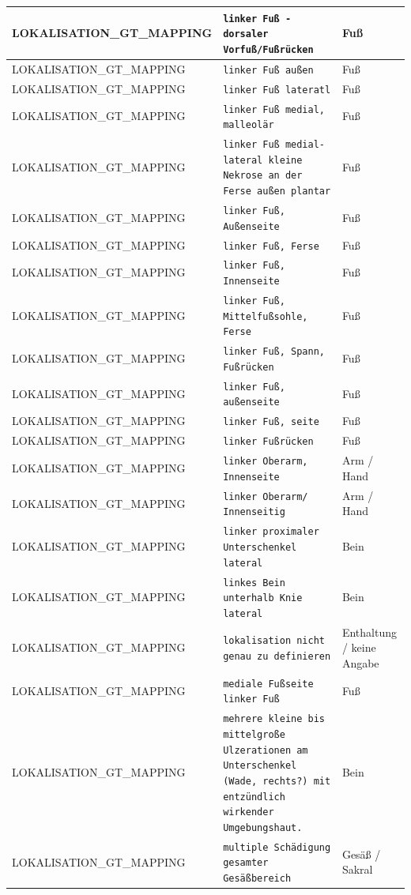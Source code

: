 \begin{longtable}{|p{3.5cm}|p{5cm}|p{6.5cm}|}
LOKALISATION\_GT\_MAPPING & \texttt{linker Fuß - dorsaler Vorfuß/Fußrücken} & Fuß \\ \hline
LOKALISATION\_GT\_MAPPING & \texttt{linker Fuß außen} & Fuß \\ \hline
LOKALISATION\_GT\_MAPPING & \texttt{linker Fuß lateratl} & Fuß \\ \hline
LOKALISATION\_GT\_MAPPING & \texttt{linker Fuß medial, malleolär} & Fuß \\ \hline
LOKALISATION\_GT\_MAPPING & \texttt{linker Fuß medial-lateral 
kleine Nekrose an der Ferse außen plantar} & Fuß \\ \hline
LOKALISATION\_GT\_MAPPING & \texttt{linker Fuß, Außenseite} & Fuß \\ \hline
LOKALISATION\_GT\_MAPPING & \texttt{linker Fuß, Ferse} & Fuß \\ \hline
LOKALISATION\_GT\_MAPPING & \texttt{linker Fuß, Innenseite} & Fuß \\ \hline
LOKALISATION\_GT\_MAPPING & \texttt{linker Fuß, Mittelfußsohle, Ferse} & Fuß \\ \hline
LOKALISATION\_GT\_MAPPING & \texttt{linker Fuß, Spann, Fußrücken} & Fuß \\ \hline
LOKALISATION\_GT\_MAPPING & \texttt{linker Fuß, außenseite} & Fuß \\ \hline
LOKALISATION\_GT\_MAPPING & \texttt{linker Fuß, seite} & Fuß \\ \hline
LOKALISATION\_GT\_MAPPING & \texttt{linker Fußrücken} & Fuß \\ \hline
LOKALISATION\_GT\_MAPPING & \texttt{linker Oberarm, Innenseite} & Arm / Hand \\ \hline
LOKALISATION\_GT\_MAPPING & \texttt{linker Oberarm/ Innenseitig} & Arm / Hand \\ \hline
LOKALISATION\_GT\_MAPPING & \texttt{linker proximaler Unterschenkel lateral} & Bein \\ \hline
LOKALISATION\_GT\_MAPPING & \texttt{linkes Bein unterhalb Knie lateral} & Bein \\ \hline
LOKALISATION\_GT\_MAPPING & \texttt{lokalisation nicht genau zu definieren} & Enthaltung / keine Angabe \\ \hline
LOKALISATION\_GT\_MAPPING & \texttt{mediale Fußseite linker Fuß} & Fuß \\ \hline
LOKALISATION\_GT\_MAPPING & \texttt{mehrere kleine bis mittelgroße Ulzerationen am Unterschenkel (Wade, rechts?) mit entzündlich wirkender Umgebungshaut.} & Bein \\ \hline
LOKALISATION\_GT\_MAPPING & \texttt{multiple Schädigung gesamter Gesäßbereich} & Gesäß / Sakral \\ \hline

\end{longtable}
